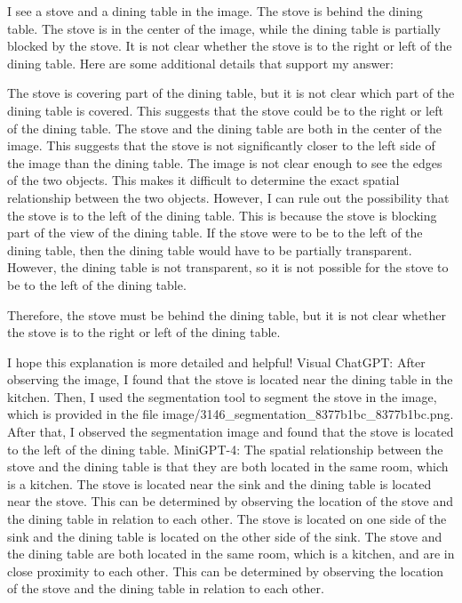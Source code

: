 \begin{enumerate}
    I see a stove and a dining table in the image.
    The stove is behind the dining table.
    The stove is in the center of the image, while the dining table is partially blocked by the stove.
    It is not clear whether the stove is to the right or left of the dining table.
    Here are some additional details that support my answer:
    
    The stove is covering part of the dining table, but it is not clear which part of the dining table is covered. This suggests that the stove could be to the right or left of the dining table.
    The stove and the dining table are both in the center of the image. This suggests that the stove is not significantly closer to the left side of the image than the dining table.
    The image is not clear enough to see the edges of the two objects. This makes it difficult to determine the exact spatial relationship between the two objects.
    However, I can rule out the possibility that the stove is to the left of the dining table. This is because the stove is blocking part of the view of the dining table. If the stove were to be to the left of the dining table, then the dining table would have to be partially transparent. However, the dining table is not transparent, so it is not possible for the stove to be to the left of the dining table.
    
    Therefore, the stove must be behind the dining table, but it is not clear whether the stove is to the right or left of the dining table.
    
    I hope this explanation is more detailed and helpful!
    \subitem Visual ChatGPT: After observing the image, I found that the stove is located near the dining table in the kitchen. Then, I used the segmentation tool to segment the stove in the image, which is provided in the file image/3146\_segmentation\_8377b1bc\_8377b1bc.png. After that, I observed the segmentation image and found that the stove is located to the left of the dining table.
    \subitem MiniGPT-4: The spatial relationship between the stove and the dining table is that they are both located in the same room, which is a kitchen. The stove is located near the sink and the dining table is located near the stove. This can be determined by observing the location of the stove and the dining table in relation to each other. The stove is located on one side of the sink and the dining table is located on the other side of the sink. The stove and the dining table are both located in the same room, which is a kitchen, and are in close proximity to each other. This can be determined by observing the location of the stove and the dining table in relation to each other.
\end{enumerate}
